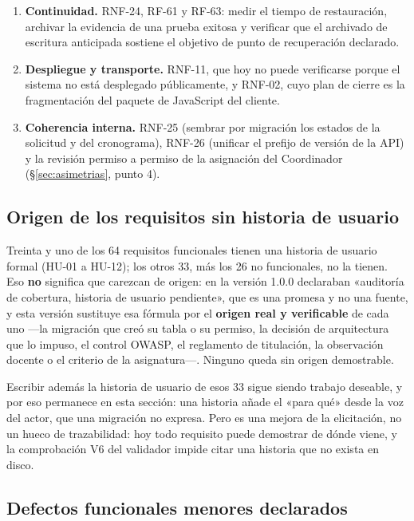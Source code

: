 \documentclass[11pt,a4paper]{article}
\begin{document}
\begin{enumerate}
    \item \textbf{Continuidad.} RNF-24, RF-61 y RF-63: medir el tiempo de restauración, archivar
          la evidencia de una prueba exitosa y verificar que el archivado de escritura anticipada
          sostiene el objetivo de punto de recuperación declarado.
    \item \textbf{Despliegue y transporte.} RNF-11, que hoy no puede verificarse porque el
          sistema no está desplegado públicamente, y RNF-02, cuyo plan de cierre es la
          fragmentación del paquete de JavaScript del cliente.
    \item \textbf{Coherencia interna.} RNF-25 (sembrar por migración los estados de la solicitud
          y del cronograma), RNF-26 (unificar el prefijo de versión de la API) y la revisión
          permiso a permiso de la asignación del Coordinador
          (\S\ref{sec:asimetrias}, punto 4).
\end{enumerate}

\subsection{Origen de los requisitos sin historia de usuario}

Treinta y uno de los 64 requisitos funcionales tienen una historia de usuario formal (HU-01 a
HU-12); los otros 33, más los 26 no funcionales, no la tienen. Eso \textbf{no} significa que
carezcan de origen: en la versión 1.0.0 declaraban «auditoría de cobertura, historia de usuario
pendiente», que es una promesa y no una fuente, y esta versión sustituye esa fórmula por el
\textbf{origen real y verificable} de cada uno ---la migración que creó su tabla o su permiso, la
decisión de arquitectura que lo impuso, el control OWASP, el reglamento de titulación, la
observación docente o el criterio de la asignatura---. Ninguno queda sin origen demostrable.

Escribir además la historia de usuario de esos 33 sigue siendo trabajo deseable, y por eso
permanece en esta sección: una historia añade el «para qué» desde la voz del actor, que una
migración no expresa. Pero es una mejora de la elicitación, no un hueco de trazabilidad: hoy todo
requisito puede demostrar de dónde viene, y la comprobación V6 del validador impide citar una
historia que no exista en disco.

\subsection{Defectos funcionales menores declarados}
\end{document}
